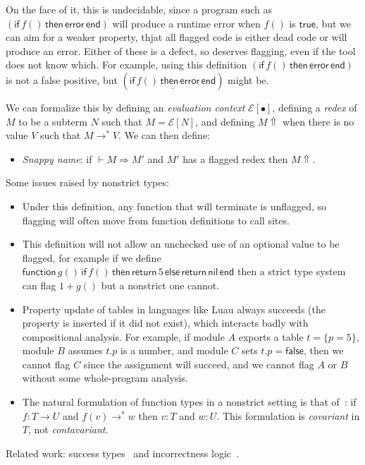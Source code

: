 \documentclass[acmsmall]{acmart}
\newcommand{\squnder}[1]{\underline{#1}}
\newcommand{\evCtx}{\mathcal{E}}
\newcommand{\NIL}{\mathsf{nil}}
\newcommand{\TRUE}{\mathsf{true}}
\newcommand{\FALSE}{\mathsf{false}}
\newcommand{\ERROR}{\mathsf{error}}
\newcommand{\IF}{\mathsf{if}\,}
\newcommand{\THEN}{\,\mathsf{then}\,}
\newcommand{\ELSE}{\,\mathsf{else}\,}
\newcommand{\END}{\,\mathsf{end}}
\newcommand{\FUNCTION}{\mathsf{function}\,}
\newcommand{\RETURN}{\mathsf{return}\,}
\begin{document}
On the face of it, this is undecidable, since a program such as
$(\IF f() \THEN \ERROR \END)$ will produce a runtime error when $f()$ is
$\TRUE$, but we can aim for a weaker property, thjat all flagged code
is either dead code or will produce an error. Either of these is a
defect, so deserves flagging, even if the tool does not know
which. For example, using this definition
$(\IF f() \THEN \squnder{\ERROR} \END)$ is not a false positive, but
$(\squnder{\IF f() \THEN \ERROR \END})$ might be.

We can formalize this by defining an \emph{evaluation context}
$\evCtx[\bullet]$, defining a \emph{redex} of $M$ to be a subterm $N$
such that $M = \evCtx[N]$, and defining $M{\Uparrow}$ when there is no
value $V$ such that $M \rightarrow^* V$. We can then define:

\begin{itemize}
\item \emph{Snappy name}: if ${} \vdash M \Rightarrow M'$ and $M'$ has a flagged redex
  then $M{\Uparrow}$.
\end{itemize}
Some issues raised by nonstrict types:
\begin{itemize}

\item Under this definition, any function that will terminate is unflagged, so
  flagging will often move from function definitions to call sites.

\item This definition will not allow an unchecked use of an optional value
  to be flagged, for example if we define $\FUNCTION g()\,\IF f() \THEN \RETURN 5 \ELSE \RETURN \NIL \END$
  then a strict type system can flag $1 + g()$ but a nonstrict one cannot.

\item Property update of tables in languages like Luau always succeeds
  (the property is inserted if it did not exist), which interacts
  badly with compositional analysis. For example, if module $A$
  exports a table $t=\{p=5\}$, module $B$ assumes $t.p$ is a number,
  and module $C$ sets $t.p=\FALSE$, then we cannot flag $C$ since the
  assignment will succeed, and we cannot flag $A$ or $B$ without some
  whole-program analysis.

\item The natural formulation of function types in a nonstrict setting
  is that of~\cite{???}: if $f: T \rightarrow U$ and $f(v) \rightarrow^* w$
  then $v:T$ and $w:U$. This formulation is \emph{covariant} in $T$,
  not \emph{contavariant}.
  
\end{itemize}
Related work: success types~\cite{???} and incorrectness logic~\cite{???}.
\end{document}

